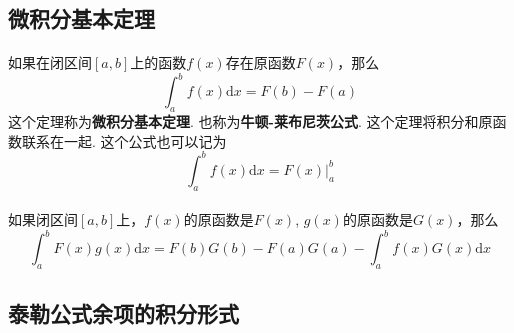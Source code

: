 \subsection{微积分基本定理}

\paragraph{}
如果在闭区间$[a, b]$上的函数$f(x)$存在原函数$F(x)$，那么
$$
\int_a^b f(x) \mathrm{d} x = F(b) - F(a)
$$
这个定理称为\textbf{微积分基本定理}. 也称为\textbf{牛顿-莱布尼茨公式}. 这个定理将积分和原函数联系在一起. 这个公式也可以记为
$$
\int_a^b f(x) \mathrm{d} x = F(x)|_a^b
$$

\paragraph{}
如果闭区间$[a, b]$上，$f(x)$的原函数是$F(x)$, $g(x)$的原函数是$G(x)$，那么
$$
\int_a^b F(x) g(x) \mathrm{d}x = F(b)G(b) - F(a)G(a) - \int_a^b f(x)G(x) \mathrm{d}x
$$

\subsection{泰勒公式余项的积分形式}
